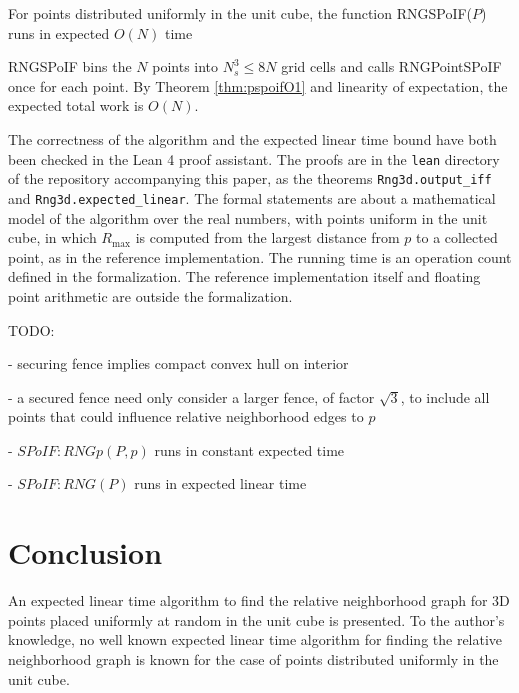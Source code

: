 \documentclass[a4paper,fleqn]{cas-dc}
\begin{document}
\begin{theorem}
  \label{thm:ppoifON}
  For points distributed uniformly in the unit cube,
  the function RNGSPoIF($P$) runs in expected $O(N)$ time
\end{theorem}

\begin{pf}
  RNGSPoIF bins the $N$ points into $N _ s^3 \le 8N$ grid cells and calls RNGPointSPoIF once for each point.
  By Theorem \ref{thm:pspoifO1} and linearity of expectation, the expected total work is $O(N)$.
\end{pf}

The correctness of the algorithm and the expected linear time bound have both been checked
in the Lean 4 proof assistant.
The proofs are in the \texttt{lean} directory of the repository accompanying this paper,
as the theorems \texttt{Rng3d.output\_iff} and \texttt{Rng3d.expected\_linear}.
The formal statements are about a mathematical model of the algorithm over the real numbers,
with points uniform in the unit cube,
in which $R _ {\text{max}}$ is computed from the largest distance from $p$ to a collected point,
as in the reference implementation.
The running time is an operation count defined in the formalization.
The reference implementation itself and floating point arithmetic are outside the formalization.

TODO:

- securing fence implies compact convex hull on interior

- a secured fence need only consider a larger fence, of factor $\sqrt{3}$, to include all points that could
  influence relative neighborhood edges to $p$

- $SPoIF:RNGp(P,p)$ runs in constant expected time

- $SPoIF:RNG(P)$ runs in expected linear time





\section{Conclusion}

An expected linear time algorithm to find the relative neighborhood graph for 3D points placed uniformly
at random in the unit cube is presented.
To the author's knowledge, no well known expected linear time algorithm for finding the relative neighborhood
graph is known for the case of points distributed uniformly in the unit cube.
\end{document}
